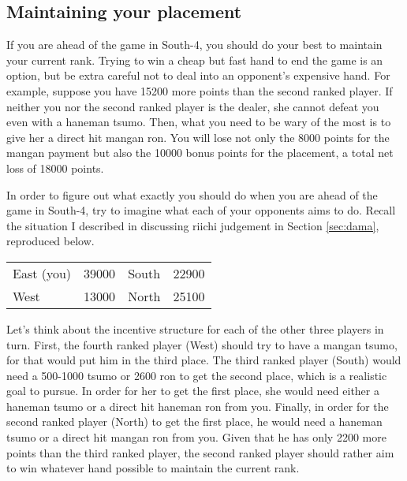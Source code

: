 \subsection*{Maintaining your placement}
If you are ahead of the game in South-4, you should do your best to maintain your current rank. Trying to win a cheap but fast hand to end the game is an option, but be extra careful not to deal into an opponent's expensive hand. For example, suppose you have 15200 more points than the second ranked player. If neither you nor the second ranked player is the dealer, she cannot defeat you even with a {\jap haneman tsumo}. Then, what you need to be wary of the most is to give her a direct hit {\jap mangan ron}. You will lose not only the 8000 points for the {\jap mangan} payment but also the 10000 bonus points for the placement, a total net loss of 18000 points.

\bigskip
In order to figure out what exactly you should do when you are ahead of the game in South-4, try to imagine what each of your opponents aims to do. Recall the situation I described in discussing {\jap riichi} judgement in Section \ref{sec:dama}, reproduced below.

\begin{table}[h]
\begin{center}
\begin{tabular}{l r l r}
East (you) & 39000 & South & 22900\\
West & 13000 & North & 25100\\
\end{tabular}
\end{center}
\vspace{-10pt}
\end{table}

\bigskip
Let's think about the incentive structure for each of the other three players in turn. First, the fourth ranked player (West) should try to have a {\jap mangan tsumo}, for that would put him in the third place. The third ranked player (South) would need a 500-1000 {\jap tsumo} or 2600 {\jap ron} to get the second place, which is a realistic goal to pursue. In order for her to get the first place, she would need either a {\jap haneman tsumo} or a direct hit {\jap haneman ron} from you. Finally, in order for the second ranked player (North) to get the first place, he would need a {\jap haneman tsumo} or a direct hit {\jap mangan ron} from you. Given that he has only 2200 more points than the third ranked player, the second ranked player should rather aim to win whatever hand possible to maintain the current rank. 

